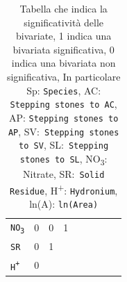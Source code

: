 \documentclass{article} %
\begin{document}
\begin{table}[H]
\begin{tabular}{lcccccccc}
            \texttt{NO\textsubscript{3}} & 0 & 0 & 1 &  &  &  &  \\
            \texttt{SR} & 0 & 1 &  &  &  &  &  \\
            \texttt{H\textsuperscript{+}} & 0 &  &  &  &  &  &  \\
        \bottomrule
    \end{tabular}
    \caption{Tabella che indica la significatività delle bivariate, 1 indica una bivariata significativa, 0 indica una bivariata non significativa, 
    In particolare Sp: \texttt{Species}, AC: \texttt{Stepping stones to AC}, AP: \texttt{Stepping stones to AP}, SV:\ \texttt{Stepping stones to SV}, SL:\ \texttt{Stepping stones to SL}, NO\textsubscript{3}: Nitrate, SR:\ \texttt{Solid Residue}, H\textsuperscript{+}: \texttt{Hydronium}, ln(A): \texttt{ln(Area)}}
    \end{table}
\end{document}

